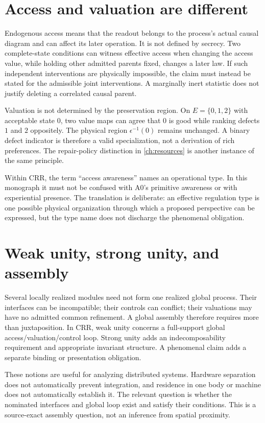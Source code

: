 \section{Access and valuation are different}\label{section:crr:access-and-valuation-are-different}
Endogenous access means that the readout belongs to the process's actual causal diagram and can affect its later operation. It is not defined by secrecy. Two complete-state conditions can witness effective access when changing the access value, while holding other admitted parents fixed, changes a later law. If such independent interventions are physically impossible, the claim must instead be stated for the admissible joint interventions. A marginally inert statistic does not justify deleting a correlated causal parent.

Valuation is not determined by the preservation region. On $E=\{0,1,2\}$ with acceptable state $0$, two value maps can agree that $0$ is good while ranking defects $1$ and $2$ oppositely. The physical region $\epsilon^{-1}(0)$ remains unchanged. A binary defect indicator is therefore a valid specialization, not a derivation of rich preferences. The repair-policy distinction in \cref{ch:resources} is another instance of the same principle.

Within CRR, the term ``access awareness'' names an operational type. In this monograph it must not be confused with A0's primitive awareness or with experiential presence. The translation is deliberate: an effective regulation type is one possible physical organization through which a proposed perspective can be expressed, but the type name does not discharge the phenomenal obligation.

\section{Weak unity, strong unity, and assembly}\label{section:crr:weak-unity-strong-unity-and-assembly}
Several locally realized modules need not form one realized global process. Their interfaces can be incompatible; their controls can conflict; their valuations may have no admitted common refinement. A global assembly therefore requires more than juxtaposition. In CRR, weak unity concerns a full-support global access/valuation/control loop. Strong unity adds an indecomposability requirement and appropriate invariant structure. A phenomenal claim adds a separate binding or presentation obligation.

These notions are useful for analyzing distributed systems. Hardware separation does not automatically prevent integration, and residence in one body or machine does not automatically establish it. The relevant question is whether the nominated interfaces and global loop exist and satisfy their conditions. This is a source-exact assembly question, not an inference from spatial proximity.

